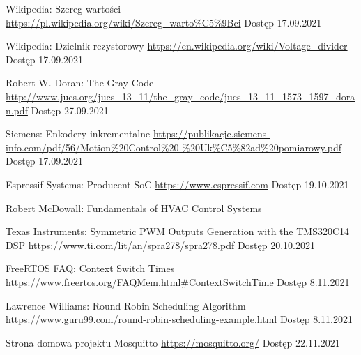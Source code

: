\begin{thebibliography}{9}
        Wikipedia: Szereg wartości  \newline
        \url{https://pl.wikipedia.org/wiki/Szereg_warto\%C5\%9Bci} \newline
        Dostęp 17.09.2021
    
        Wikipedia: Dzielnik rezystorowy  \newline
        \url{https://en.wikipedia.org/wiki/Voltage\_divider} \newline
        Dostęp 17.09.2021
        
        Robert W. Doran: The Gray Code  \newline
        \url{http://www.jucs.org/jucs_13_11/the_gray_code/jucs_13_11_1573_1597_doran.pdf} \newline
        Dostęp 27.09.2021
        
        Siemens: Enkodery inkrementalne  \newline
        \url{https://publikacje.siemens-info.com/pdf/56/Motion\%20Control\%20-\%20Uk\%C5\%82ad\%20pomiarowy.pdf} \newline
        Dostęp 17.09.2021
        
        Espressif Systems: Producent SoC \newline
        \url{https://www.espressif.com}
        Dostęp 19.10.2021
  
        Robert McDowall: Fundamentals of HVAC Control Systems 
        
        Texas Instruments: Symmetric PWM Outputs Generation with the TMS320C14 DSP \newline
        \url{https://www.ti.com/lit/an/spra278/spra278.pdf}
        Dostęp 20.10.2021
        
        FreeRTOS FAQ: Context Switch Times \newline
        \url{https://www.freertos.org/FAQMem.html#ContextSwitchTime}
        Dostęp 8.11.2021        
        
        Lawrence Williams: Round Robin Scheduling Algorithm \newline
        \url{https://www.guru99.com/round-robin-scheduling-example.html}
        Dostęp 8.11.2021        

        Strona domowa projektu Mosquitto \newline
        \url{https://mosquitto.org/}
        Dostęp 22.11.2021
  

\end{thebibliography}
